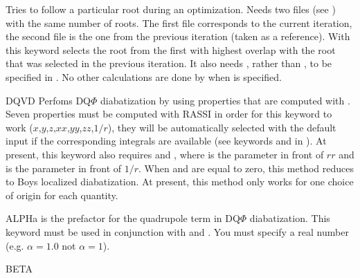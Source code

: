 \begin{keywordlist}
Tries to follow a particular root during an optimization.
Needs two  files (see ) with the same
number of roots. The first file corresponds to the current iteration,
the second file is the one from the previous iteration (taken as a reference).
With this keyword  selects the root from the first 
with highest overlap with the root that was selected in the previous
iteration. It also needs , rather than ,
to be specified in .
No other calculations are done by  when 
is specified.
\item[DQVD]
Perfoms DQ$\Phi$ diabatization\cite{Hoyer:2014fk} by using properties that are computed with .
Seven properties must be computed with RASSI in order for this keyword to work
($x$,$y$,$z$,$xx$,$yy$,$zz$,$1/r$), they will be automatically selected with the default input
if the corresponding integrals are available (see keywords  and  in ).
At present, this keyword also requires  and , where
 is the parameter in front of $rr$ and  is the parameter
in front of $1/r$.  When  and  are equal to zero, this
method reduces to Boys localized diabatization\cite{Subotnik:2008fk}.
At present, this method only works for one choice of origin for each quantity.
\item[ALPHa]
 is the prefactor for the quadrupole term in DQ$\Phi$ diabatization.  This
keyword must be used in conjunction with  and .  You must
specify a real number (e.g. $\alpha = 1.0$ not $\alpha = 1$).
\item[BETA]

\end{keywordlist}
